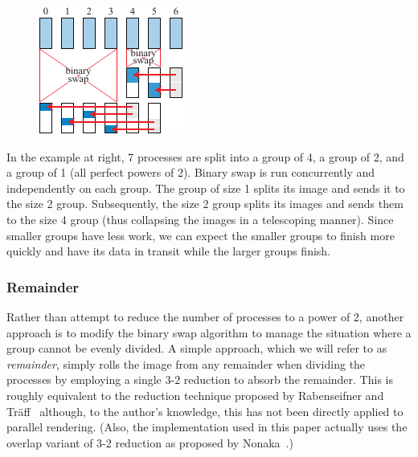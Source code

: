 \documentclass{vgtc}                          %
\newcommand*{\scite}[1]{~\cite{#1}}
\newcommand*{\keyterm}[1]{\emph{#1}}
\newcommand*{\textalgorithm}[1]{\textsf{#1}\xspace}
\newcommand{\telescoping}{\textalgorithm{telescoping}}
\newcommand{\remainder}{\textalgorithm{remainder}}
\begin{document}
\begin{figure}
  \includegraphics[scale=.75]{telescoping-7-proc}
\end{figure}
In the example at right, 7 processes are split into a group of 4, a group of 2, and a group of 1 (all perfect powers of 2).
Binary swap is run concurrently and independently on each group.
The group of size 1 splits its image and sends it to the size 2 group.
Subsequently, the size 2 group splits its images and sends them to the size 4 group (thus collapsing the images in a telescoping manner).
Since smaller groups have less work, we can expect the smaller groups to finish more quickly and have its data in transit while the larger groups finish.


\subsubsection{Remainder}

Rather than attempt to reduce the number of processes to a power of 2, another approach is to modify the binary swap algorithm to manage the situation where a group cannot be evenly divided.
A simple approach, which we will refer to as \keyterm{\remainder}, simply rolls the image from any remainder when dividing the processes by employing a single 3-2 reduction to absorb the remainder.
This is roughly equivalent to the reduction technique proposed by Rabenseifner and Tr\"{a}ff\scite{Rabenseifner2004} although, to the author's knowledge, this has not been directly applied to parallel rendering.
(Also, the implementation used in this paper actually uses the overlap variant of 3-2 reduction as proposed by Nonaka\scite{Nonaka2015}.)
\end{document}
